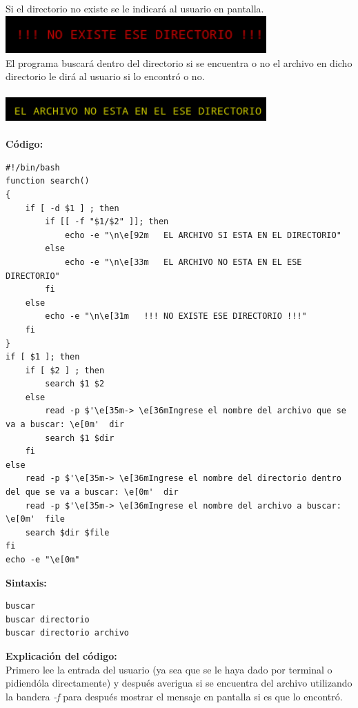 \documentclass[12pt,a4paper]{article}
\begin{document}
    \justifying
    \noindent
    Si el directorio no existe se le indicará al usuario en pantalla.
    \\

    \centering
    \includegraphics[width=10cm]{img/buscar_no_dir.png}
    \\
    
    \justifying
    \noindent
    El programa buscará dentro del directorio si se encuentra o no el archivo en dicho directorio le dirá al usuario si lo encontró o no.
    \\\\

    \centering
    \includegraphics[width=10cm]{img/buscar_not_found.png}
    \\\\

    \noindent
    \justifying
    \textbf{Código:}
    \\
    \begin{lstlisting}[style=BashInputStyle]
#!/bin/bash
function search()
{
	if [ -d $1 ] ; then
		if [[ -f "$1/$2" ]]; then
			echo -e "\n\e[92m	EL ARCHIVO SI ESTA EN EL DIRECTORIO"
		else 
			echo -e "\n\e[33m	EL ARCHIVO NO ESTA EN EL ESE DIRECTORIO"
		fi
	else
		echo -e "\n\e[31m	!!! NO EXISTE ESE DIRECTORIO !!!"
	fi
}
if [ $1 ]; then
	if [ $2 ] ; then
		search $1 $2
	else
		read -p $'\e[35m-> \e[36mIngrese el nombre del archivo que se va a buscar: \e[0m'  dir
		search $1 $dir
	fi
else 
	read -p $'\e[35m-> \e[36mIngrese el nombre del directorio dentro del que se va a buscar: \e[0m'  dir
	read -p $'\e[35m-> \e[36mIngrese el nombre del archivo a buscar: \e[0m'  file
	search $dir $file
fi
echo -e "\e[0m"
    \end{lstlisting}

    \textbf{Sintaxis:}
    \begin{lstlisting}[style=BashInputStyle]
buscar
buscar directorio
buscar directorio archivo
    \end{lstlisting}
    \textbf{Explicación del código:} \\
    Primero lee la entrada del usuario (ya sea que se le haya dado por terminal o pidiendóla directamente) y después averigua si se encuentra del archivo utilizando la bandera \textit{-f} para después mostrar el mensaje en pantalla si es que lo encontró.
\end{document}
